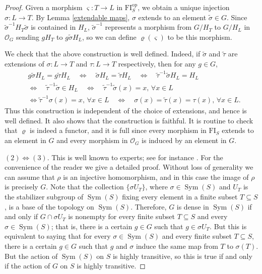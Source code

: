 \documentclass[11pt, reqno]{amsart}
\theoremstyle{plain}
\numberwithin{equation}{section}
\theoremstyle{definition}
\DeclareMathOperator{\Sym}{Sym}
\newcommand{\FI}{{\mathrm{FI}}}
\newcommand{\op}{{\mathrm{op}}}
\begin{document}
\begin{proof}
Given a morphism $\varsigma: T \to L$ in $\FI_S^{\op}$, we obtain a unique injection $\sigma: L \to T$. By Lemma \ref{extendable maps}, $\sigma$ extends to an element $\tilde{\sigma} \in G$. Since $\tilde{\sigma}^{-1}H_T \tilde{\sigma}$ is contained in $H_L$, $\tilde{\sigma}^{-1}$ represents a morphism from $G/H_T$ to $G/H_L$ in $\mathcal{O}_G$ sending $gH_T$ to $g \tilde{\sigma} H_L$, so we can define $\varrho(\varsigma)$ to be this morphism.

We check that the above construction is well defined. Indeed, if $\tilde{\sigma}$ and $\tilde{\tau}$ are extensions of $\sigma: L \to T$ and $\tau: L \to T$ respectively, then for any $g \in G$,
\begin{align*}
& g \tilde{\sigma} H_L = g \tilde{\tau} H_L \quad \Longleftrightarrow \quad \tilde{\sigma} H_L = \tilde{\tau} H_L \quad \Longleftrightarrow \quad \tilde{\tau}^{-1} \tilde{\sigma} H_L = H_L\\
& \Longleftrightarrow \quad \tilde{\tau}^{-1} \tilde{\sigma} \in H_L \quad \Longleftrightarrow \quad \tilde{\tau}^{-1} \tilde{\sigma}(x) = x, \, \forall x \in L\\
& \Longleftrightarrow \tilde{\tau}^{-1} \sigma (x) = x, \, \forall x \in L \quad \Longleftrightarrow \quad \sigma(x) = \tilde{\tau} (x) = \tau(x), \, \forall x \in L.
\end{align*}
Thus this construction is independent of the choice of extensions, and hence is well defined. It also shows that the construction is faithful. It is routine to check that $\varrho$ is indeed a functor, and it is full since every morphism in $\FI_S$ extends to an element in $G$ and every morphism in $\mathcal{O}_G$ is induced by an element in $G$.

$(2) \Leftrightarrow (3)$. This is well known to experts; see for instance \cite[Section 4.2]{Ca}. For the convenience of the reader we give a detailed proof. Without loss of generality we can assume that $\rho$ is an injective homomorphism, and in this case the image of $\rho$ is precisely $G$. Note that the collection $\{ \sigma U_T \}$, where $\sigma \in \Sym(S)$ and $U_T$ is the stabilizer subgroup of $\Sym(S)$ fixing every element in a finite subset $T \subseteq S$, is a base of the topology on $\Sym(S)$. Therefore, $G$ is dense in $\Sym(S)$ if and only if $G \cap \sigma U_T$ is nonempty for every finite subset $T \subseteq S$ and every $\sigma \in \Sym(S)$; that is, there is a certain $g \in G$ such that $g \in \sigma U_T$. But this is equivalent to saying that for every $\sigma \in \Sym(S)$ and every finite subset $T \subseteq S$, there is a certain $g \in G$ such that $g$ and $\sigma$ induce the same map from $T$ to $\sigma(T)$. But the action of $\Sym(S)$ on $S$ is highly transitive, so this is true if and only if the action of $G$ on $S$ is highly transitive.
\end{proof}
\end{document}
